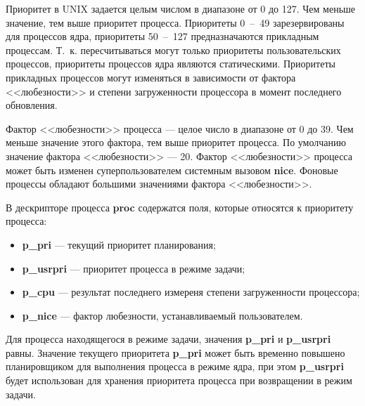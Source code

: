 Приоритет в UNIX задается целым числом в диапазоне от 0 до 127. Чем меньше значение, тем выше приоритет процесса. Приоритеты 0~--~49 зарезервированы для процессов ядра, приоритеты 50~--~127 предназначаются прикладным процессам. Т.~к. пересчитываться могут только приоритеты пользовательских процессов, приоритеты процессов ядра являются статическими. Приоритеты прикладных процессов могут изменяться в зависимости от фактора <<любезности>> и степени загруженности процессора в момент последнего обновления.

Фактор <<любезности>> процесса --- целое число в диапазоне от 0 до 39. Чем меньше значение этого фактора, тем выше приоритет процесса. По умолчанию значение фактора <<любезности>>  --- 20. Фактор <<любезности>> процесса может быть изменен суперпользователем системным вызовом \textbf{nice}. Фоновые процессы обладают большими значениями фактора <<любезности>>.

В дескрипторе процесса \textbf{proc} содержатся поля, которые относятся к приоритету процесса:
\begin{itemize}
    \item \textbf{p_pri} --- текущий приоритет планирования;
    \item \textbf{p_usrpri} --- приоритет процесса в режиме задачи;
    \item \textbf{p_cpu} --- результат последнего измереня степени загруженности процессора;
    \item \textbf{p_nice} --- фактор любезности, устанавливаемый пользователем.
\end{itemize}

Для процесса находящегося в режиме задачи, значения \textbf{p_pri} и \textbf{p_usrpri} равны. Значение текущего приоритета \textbf{p_pri} может быть временно повышено планировщиком для выполнения процесса в режиме ядра, при этом \textbf{p_usrpri} будет использован для хранения приоритета процесса при возвращении в режим задачи.

